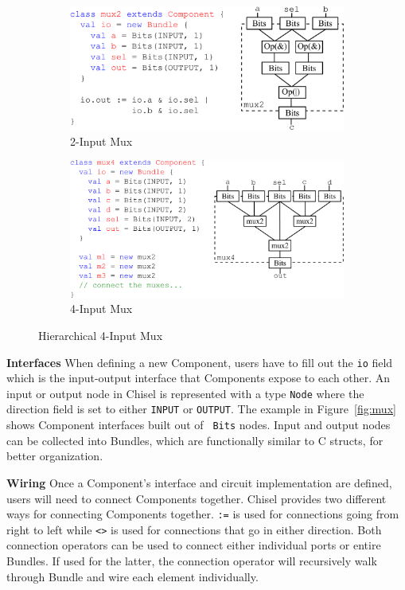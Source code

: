 \begin{figure}
\centering
  \begin{subfigure}[t]{0.48\textwidth}
  \centering
  \includegraphics[width=\textwidth]{figures/mux2.pdf}
  \caption{2-Input Mux}
  \label{fig:mux2}
  \end{subfigure}
  \hfill
  \begin{subfigure}[t]{0.48\textwidth}
  \centering
  \includegraphics[width=\textwidth]{figures/mux4.pdf}
  \caption{4-Input Mux}
  \label{fig:mux4}
  \end{subfigure}
  \caption{Hierarchical 4-Input Mux}
  \label{fig:muxcomp}
\end{figure}

{\bf Interfaces} When defining a new Component, users have to fill out
the {\tt io} field which is the input-output interface that
Components expose to each other. An input or output node in Chisel is
represented with a type {\tt Node} where the direction field is set to
either {\tt INPUT} or {\tt OUTPUT}. The example in
Figure~\ref{fig:mux} shows Component interfaces built out of {\tt
Bits} nodes. Input and output nodes can be
collected into Bundles, which are functionally similar to C
structs, for better organization. 

{\bf Wiring} Once a Component's interface and circuit
implementation are defined, users will need to connect Components
together. Chisel provides two different ways for connecting
Components together. {\tt :=} is used for connections going from
right to left while {\tt <>} is used for connections that go in either
direction. Both connection operators can be used to connect either individual
ports or entire Bundles. If used for the latter, the connection
operator will recursively walk through Bundle and wire each element
individually.

